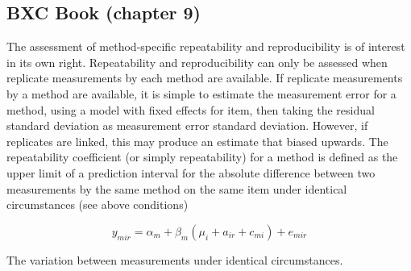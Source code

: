 \subsection{BXC Book (chapter 9)}
The assessment of method-specific repeatability and reproducibility is of interest in its own right.
Repeatability and reproducibility can only be assessed when replicate measurements by each method are available.
If replicate measurements by a method are available, it is simple to estimate the measurement error for a method, using a model with fixed effects for item, then taking the residual standard deviation as measurement error standard deviation.
However, if replicates are linked, this may produce an estimate that biased upwards.
The repeatability coefficient (or simply repeatability) for a method is defined as the upper limit of a
prediction interval for the absolute difference between two measurements by the same method on the same
item under identical circumstances (see above conditions)

\[y_{mir}  = \alpha_{m} + \beta_m( \mu_i + a_{ir} + c_{mi}) + e_{mir}\]

The variation between measurements under identical circumstances.


